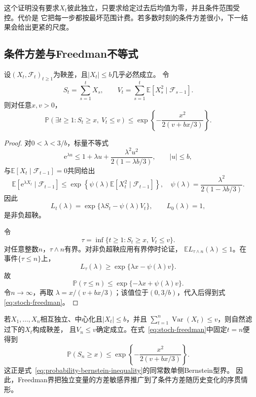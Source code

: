 这个证明没有要求$X_t$彼此独立，只要求给定过去后均值为零，并且条件范围受控。代价是
它把每一步都按最坏范围计费。若多数时刻的条件方差很小，下一结果会给出更紧的尺度。

\subsection{条件方差与Freedman不等式}

\begin{theorem}[标量Freedman不等式]
  \label{thm:stoch-freedman}
  设$(X_t,\mathcal{F}_t)_{t\geq1}$为鞅差，且$|X_t|\leq b$几乎必然成立。
  令
  \[
    S_t=\sum_{s=1}^{t}X_s,\qquad
    V_t=\sum_{s=1}^{t}
      \mathbb{E}[X_s^2\mid\mathcal{F}_{s-1}].
  \]
  则对任意$x,v>0$，
  \begin{equation}
    \mathbb{P}\left(\exists t\geq1:S_t\geq x,\ V_t\leq v\right)
    \leq\exp\left\{
      -\frac{x^2}{2(v+bx/3)}
    \right\}.
    \label{eq:stoch-freedman}
  \end{equation}
\end{theorem}

\begin{proof}
对$0<\lambda<3/b$，标量不等式
\[
  \mathrm{e}^{\lambda u}
  \leq
  1+\lambda u+
  \frac{\lambda^2u^2}{2(1-\lambda b/3)},
  \qquad |u|\leq b,
  \]
与$\mathbb{E}[X_t\mid\mathcal{F}_{t-1}]=0$共同给出
\[
  \mathbb{E}[
    \mathrm{e}^{\lambda X_t}
    \mid\mathcal{F}_{t-1}]
  \leq
  \exp\left\{
    \psi(\lambda)
    \mathbb{E}[X_t^2\mid\mathcal{F}_{t-1}]
  \right\},
  \quad
  \psi(\lambda)=
  \frac{\lambda^2}{2(1-\lambda b/3)}.
\]
因此
\[
  L_t(\lambda)
  =
  \exp\{\lambda S_t-\psi(\lambda)V_t\},
  \qquad L_0(\lambda)=1,
\]
是非负超鞅。

令
\[
  \tau
  =
  \inf\{t\geq1:S_t\geq x,\ V_t\leq v\}.
  \]
对任意整数$n$，$\tau\wedge n$有界。对非负超鞅应用有界停时论证，
$\mathbb{E}L_{\tau\wedge n}(\lambda)\leq1$。在事件$\{\tau\leq n\}$上，
  \[
  L_\tau(\lambda)\geq\exp\{\lambda x-\psi(\lambda)v\}.
  \]
故
\[
  \mathbb{P}(\tau\leq n)\leq\exp\{-\lambda x+\psi(\lambda)v\}.
  \]
令$n\to\infty$，再取
$\lambda=x/(v+bx/3)$；该值位于$(0,3/b)$，代入后得到式
\eqref{eq:stoch-freedman}。
\end{proof}

若$X_1,\ldots,X_n$相互独立、中心化且$|X_t|\leq b$，并且
$\sum_{t=1}^{n}\operatorname{Var}(X_t)\leq v$，则自然滤过下的$X_t$构成鞅差，
且$V_n\leq v$确定成立。在式~\eqref{eq:stoch-freedman}中固定$t=n$便得到
\[
  \mathbb{P}(S_n\geq x)
  \leq
  \exp\left\{
    -\frac{x^2}{2(v+bx/3)}
  \right\}.
\]
这正是式~\eqref{eq:probability-bernstein-inequality}的同常数单侧Bernstein型界。
因此，Freedman界把独立变量的方差敏感界推广到了条件方差随历史变化的序贯情形。

